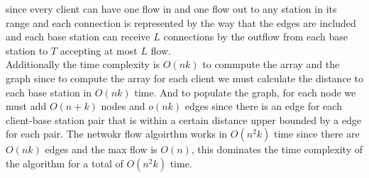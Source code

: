 \documentclass{amsart}
\begin{document}
since every client can have one flow in and one flow out to any station in its range and each connection is represented by the way that the edges are included  and each base station can receive $L$ connections by the outflow from each base station to $T$ accepting at most $L$ 
flow. \\
Additionally the time complexity is $O(nk)$ to commpute the array and the graph since to compute the array for each client we must calculate the distance to each base station in $O(nk)$ time.
And to populate the graph, for each node we must add  $O(n+k)$ nodes and $o(nk)$ edges since there is an edge for each client-base station pair that is within a certain distance upper bounded by a edge for each pair.
The netwokr flow algoirthm works in  $O(n^2k)$ time since there are $O(nk)$ edges and the max flow is $O(n)$, this dominates the time complexity of the algorithm for a total of $O(n^2k)$ time.
\end{document}
